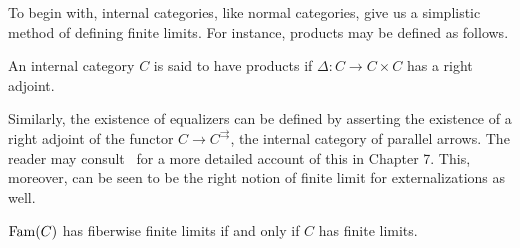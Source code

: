 To begin with, internal categories, like normal categories, give us a
simplistic method of defining finite limits. For instance, products
may be defined as follows.
\begin{defn}\label{defn:completeness:products}
  An internal category $C$ is said to have products if
  $\Delta : C \to C \times C$ has a right adjoint.
\end{defn}
Similarly, the existence of equalizers can be defined by asserting the
existence of a right adjoint of the functor
$C \to C^{\rightrightarrows}$, the internal category of parallel
arrows. The reader may consult~\citet{Jacobs:99} for a more detailed
account of this in Chapter 7. This, moreover, can be seen to be the
right notion of finite limit for externalizations as well.
\begin{thm}\label{defn:completeness:finlimexternalization}
  $\operatorname{Fam}(C)$ has fiberwise finite limits if and only if $C$ has
  finite limits.
\end{thm}
